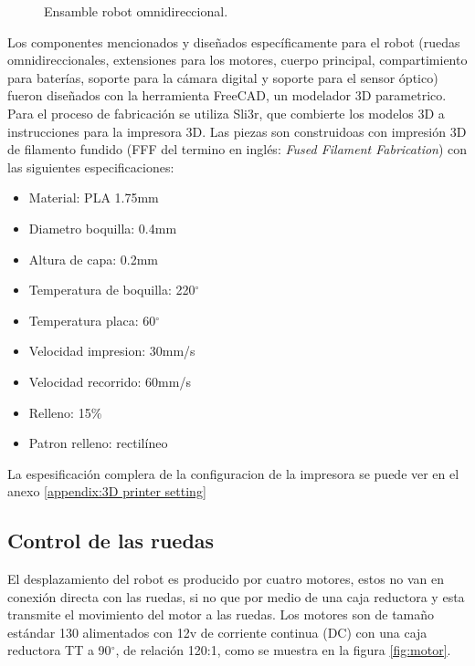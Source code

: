 \documentclass{iccmemoria}
\begin{document}
\begin{figure}[H]
  \centering
  
  \caption{Ensamble robot omnidireccional.}
  \label{fig:robot_assembly}
\end{figure}

Los componentes mencionados y diseñados específicamente para el robot (ruedas omnidireccionales, extensiones para los motores, cuerpo principal, compartimiento para baterías, soporte para la cámara digital y soporte para el sensor óptico) fueron diseñados con la herramienta FreeCAD, un modelador 3D parametrico. Para el proceso de fabricación se utiliza Sli3r, que combierte los modelos 3D a instrucciones para la impresora 3D. Las piezas son construidoas con impresión 3D de filamento fundido (FFF del termino en inglés: \emph{Fused Filament Fabrication}) con las siguientes especificaciones:\\

\begin{itemize}
	\item Material: PLA 1.75mm
	\item Diametro boquilla: 0.4mm
	\item Altura de capa: 0.2mm
	\item Temperatura de boquilla: 220$^{\circ}$
	\item Temperatura placa: 60$^{\circ}$
	\item Velocidad impresion: 30mm/s
	\item Velocidad recorrido: 60mm/s
	\item Relleno: 15\%
	\item Patron relleno: rectilíneo
\end{itemize}

La espesificación complera de la configuracion de la impresora se puede ver en el anexo \ref{appendix:3D printer setting}

\subsection{Control de las ruedas}

El desplazamiento del robot es producido por cuatro motores, estos no van en conexión directa con las ruedas, si no que por medio de una caja reductora y esta transmite el movimiento del motor a las ruedas. Los motores son de tamaño estándar 130 alimentados con 12v de corriente continua (DC) con una caja reductora TT a 90$^{\circ}$, de relación 120:1, como se muestra en la figura \ref{fig:motor}.\\
\end{document}

